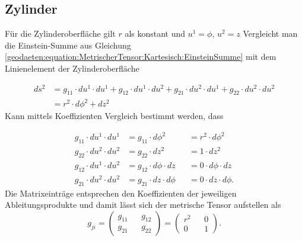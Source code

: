 %
%
%
%
\subsection{Zylinder\label{geodaeten:section:MetrischerTensor:Zylinder}}

Für die Zylinderoberfläche gilt $r$ als konstant und $u^1 = \phi$, $u^2 =z$ 
Vergleicht man die Einstein-Summe aus Gleichung \eqref{geodaeten:equation:MetrischerTensor:Kartesisch:EinsteinSumme} mit dem Linienelement der Zylinderoberfläche

\begin{equation}
	\begin{aligned}
	ds^2 &= g_{11} \cdot du^1 \cdot du^1 + g_{12} \cdot du^1 \cdot du^2 + g_{21} \cdot du^2 \cdot du^1 + g_{22} \cdot du^2 \cdot du^2 \\
	&= r^2 \cdot d \phi^2 +dz^2
	\end{aligned}
\end{equation}
Kann mittels Koeffizienten Vergleich bestimmt werden, dass 

\begin{equation}
	\begin{alignedat}{3}
		g_{11} \cdot du^1 \cdot du^1 &= g_{11} \cdot d \phi^2 & &= r^2 \cdot d \phi^2 \\
		g_{22} \cdot du^2 \cdot du^2 &= g_{22} \cdot dz^2    & &= 1 \cdot dz^2 \\
		g_{12} \cdot du^1 \cdot du^2 &= g_{12} \cdot d \phi \cdot dz & &= 0 \cdot d \phi \cdot dz \\
		g_{21} \cdot du^2 \cdot du^2 &= g_{21} \cdot dz \cdot d \phi & &= 0 \cdot dz \cdot d \phi .
	\end{alignedat}
\end{equation}
Die Matrixeinträge entsprechen den Koeffizienten der jeweiligen Ableitungsprodukte und damit lässt sich der metrische Tensor aufstellen als
\begin{equation}
	g_{ji} =\begin{pmatrix} g_{11} && g_{12} \\ g_{21} && g_{22} \end{pmatrix}= \begin{pmatrix} r^2 && 0 \\ 0 && 1 \end{pmatrix} .
\end{equation}

